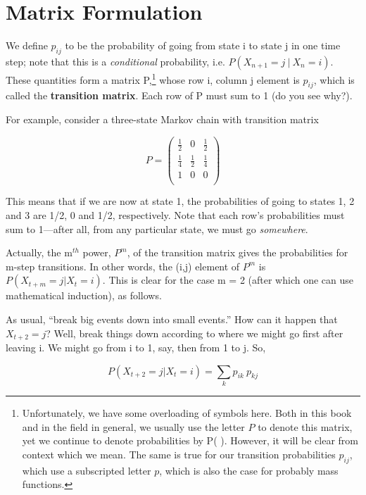 \section{Matrix Formulation}
\label{transmat}

We define $p_{ij}$ to be the probability of going from state i to state
j in one time step; note that this is a {\it conditional} probability,
i.e. $P(X_{n+1} = j ~|~ X_n = i)$.  These quantities form a matrix
P,\footnote{Unfortunately, we have some overloading of symbols here.
Both in this book and in the field in general, we usually use the letter
$P$ to denote this matrix, yet we continue to denote probabilities by P(
).  However, it will be clear from context which we mean.  The same is
true for our transition probabilities $p_{ij}$, which use a subscripted
letter $p$, which is also the case for probably mass functions.} whose
row i, column j element is $p_{ij}$, which is called the {\bf transition
matrix}.  Each row of P must sum to 1 (do you see why?).

For example, consider a three-state Markov chain with transition matrix

\begin{equation}
P =
\left (
\begin{array}{rrr}
\frac{1}{2} & 0 & \frac{1}{2} \\
\frac{1}{4} & \frac{1}{2} & \frac{1}{4} \\
1 & 0 & 0 \\
\end{array}
\right )
\end{equation}

This means that if we are now at state 1, the probabilities of going to
states 1, 2 and 3 are 1/2, 0 and 1/2, respectively.  Note that each
row's probabilities must sum to 1---after all, from any particular
state, we must go {\it somewhere}.

Actually, the m$^{th}$ power, $P^m$, of the transition matrix gives the
probabilities for m-step transitions.  In other words, the (i,j) element
of $P^m$ is $P(X_{t+m} = j | X_t = i)$.  This is clear for the case m =
2 (after which one can use mathematical induction), as follows.  

As usual, ``break big events down into small events.''  How can it
happen that $X_{t+2} = j$?  Well, break things down according to where
we might go first after leaving i.  We might go from i to 1, say, then
from 1 to j.  So,

\begin{equation}
P(X_{t+2} = j | X_t = i) = \sum_{k} p_{ik} ~ p_{kj}
\end{equation}

